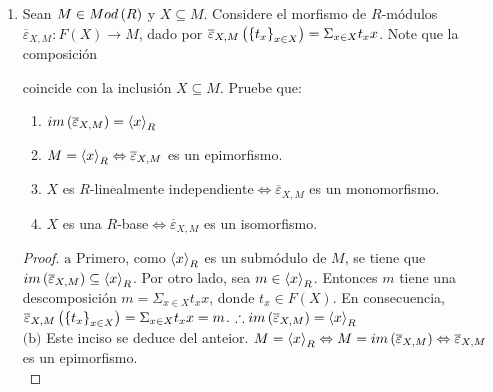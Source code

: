 \documentclass{article}
\begin{document}
\begin{enumerate}[label=\textbf{Ej \arabic*.}]
\begin{proof}
\begin{align*}
					\implies & \restrict{\overline{f}}{X}=f.
			\end{align*}
		Finalmente, sea $g:F\to N$ un morfismo de $R$-módulos tal que $\restrict{g}{X}=f$ y $a\in F$. Se tiene lo siguiente:
			\begin{align*}
				g\lrprth{a}&=g\lrprth{\sum_{x\in X_a}r_x x}\\
				&=\sum_{x\in X_a}r_x g\lrprth{x}\\
				&=\sum_{x\in X_a}r_x f\lrprth{x}\\
				&=\overline{f}(x).\\
				\implies & g=\overline{f}.
			\end{align*}
		\end{proof}
		\item Sean $M \in Mod\left(R\right)$ y $X \subseteq M$. Considere el morfismo de $R$-módulos $\overline{\varepsilon}_{X,M}:F(X) \longrightarrow M$, dado por $\overline{\varepsilon}_{X,M}\left({\left\{{t}_{x}\right\}}_{x\in X}\right)=\displaystyle\Sigma_{x \in X}t_{x}x$. Note que la composición
		coincide con la inclusión $X \subseteq M$. Pruebe que:
		\begin{enumerate}
			\item $im\left(\overline{\varepsilon}_{X,M}\right)=\left< x\right>_{R}$
			\item $M=\left< x\right>_{R}\Leftrightarrow\overline{\varepsilon}_{X,M}$ es un epimorfismo.
			\item $X$ es $R$-linealmente independiente$\Leftrightarrow\overline{\varepsilon}_{X,M}$ es un monomorfismo.
			\item $X$ es una $R$-base$\Leftrightarrow\overline{\varepsilon}_{X,M}$ es un isomorfismo.
		\end{enumerate}
		\begin{proof}
			$\boxed{\text{a}}$ Primero, como $\left< x\right>_{R}$ es un submódulo de $M$, se tiene que $im\left(\overline{\varepsilon}_{X,M}\right)\subseteq\left< x\right>_{R}$. Por otro lado, sea $m\in\left< x\right>_{R}$. Entonces $m$ tiene una descomposición $m=\displaystyle\Sigma_{x \in X}t_{x}x$, donde $t_{x} \in F(X)$. En consecuencia, $\overline{\varepsilon}_{X,M}\left({\left\{{t}_{x}\right\}}_{x\in X}\right)=\displaystyle\Sigma_{x \in X}t_{x}x=m$. $\therefore im\left(\overline{\varepsilon}_{X,M}\right)=\left< x\right>_{R}$\\
			
			$\boxed{\text{(b)}}$ Este inciso se deduce del anteior. $M=\left< x\right>_{R}\Leftrightarrow M=im\left(\overline{\varepsilon}_{X,M}\right)\Leftrightarrow\overline{\varepsilon}_{X,M}$ es un epimorfismo.\\
			

\end{proof}
\end{enumerate}
\end{document}
